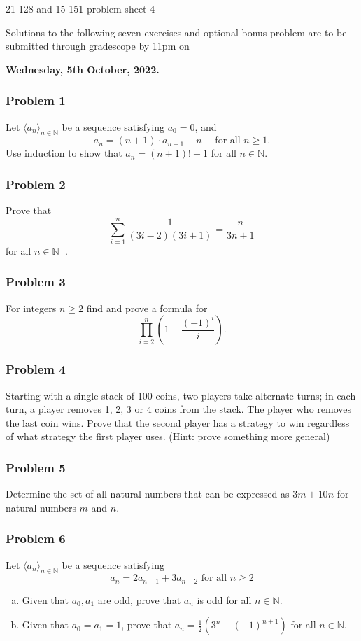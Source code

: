 \documentclass[11pt,onecolumn,fleqn]{article}
\theoremstyle{definition}
\begin{document}
\thispagestyle{empty}
\begin{center}
{\Huge 21-128 and 15-151 problem sheet 4}

Solutions to the following seven exercises and optional bonus problem are to be submitted through 
gradescope by 11pm on

\textbf{Wednesday, 5th October, 2022.}

\end{center}


\subsubsection*{Problem 1}
Let $\langle a_n \rangle_{n \in \mathbb{N}}$ be a sequence satisfying $a_0 = 0$,
and $$a_n = (n+1)\cdot a_{n-1} + n \quad \text{ for all  } n \ge 1.$$
Use induction to show that $a_n = (n+1)! -1$ for all $n \in \mathbb{N}$.


\subsubsection*{Problem 2}
Prove that
$$\sum_{i=1}^n \frac{1}{(3i-2)(3i+1)} = \frac{n}{3n+1}$$
for all $n \in \mathbb{N^{+}}$.


\subsubsection*{Problem 3}
For integers $n \geq 2$ find and prove a formula for $$\prod_{i=2}^n (1 - \frac{(-1)^i}{i}).$$


\subsubsection*{Problem 4}
Starting with a single stack of 100 coins, two players take alternate turns; in each turn, a player removes 
1, 2, 3 or 4 coins from the stack. The player who removes the last coin wins.
Prove that the second player has a strategy to win regardless of what strategy the first player uses.
(Hint: prove something more general)


\subsubsection*{Problem 5}
Determine the set of all natural numbers that can be expressed as $3m + 10n$ for natural numbers $m$ and $n$.


\subsubsection*{Problem 6}
Let $\langle a_n \rangle_{n \in \mathbb{N}}$ be a sequence satisfying
$$a_n = 2a_{n-1} + 3a_{n-2} \text{ for all } n \ge 2$$
\begin{enumerate}[(a)]
\item Given that $a_0,a_1$ are odd, prove that $a_n$ is odd for all $n \in \mathbb{N}$.
\item Given that $a_0=a_1=1$, prove that $a_n = \frac{1}{2} \left( 3^{n} - (-1)^{n+1} \right)$ for all 
$n \in \mathbb{N}$.
\end{enumerate}
\end{document}
